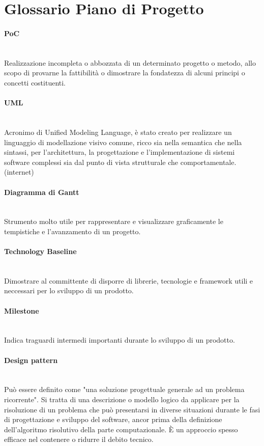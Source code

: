 \section{Glossario Piano di Progetto}

\paragraph{PoC}~\smallskip \\
Realizzazione incompleta o abbozzata di un determinato progetto o metodo, allo scopo di 
provarne la fattibilità o dimostrare la fondatezza di alcuni principi o concetti costituenti.

\paragraph{UML}~\smallskip \\
Acronimo di Unified Modeling Language, è stato creato per realizzare un linguaggio di modellazione visivo comune, ricco 
sia nella semantica che nella sintassi, per l'architettura, la progettazione e l'implementazione di sistemi 
software complessi sia dal punto di vista strutturale che comportamentale. (internet)

\paragraph{Diagramma di Gantt}~\smallskip \\
Strumento molto utile per rappresentare e visualizzare graficamente le tempistiche e l'avanzamento di un progetto.

\paragraph{Technology Baseline}~\smallskip \\
Dimostrare al committente di disporre di librerie, tecnologie e framework utili e neccessari per lo sviluppo di un prodotto.

\paragraph{Milestone}~\smallskip \\
Indica traguardi intermedi importanti durante lo sviluppo di un prodotto.

\paragraph{Design pattern}~\smallskip \\
Può essere definito come "una soluzione progettuale generale ad un problema ricorrente".
Si tratta di una descrizione o modello logico da applicare per la risoluzione di un problema che può 
presentarsi in diverse situazioni durante le fasi di progettazione e sviluppo del software, ancor prima della definizione 
dell'algoritmo risolutivo della parte computazionale. È un approccio spesso efficace nel contenere o ridurre il debito tecnico.

